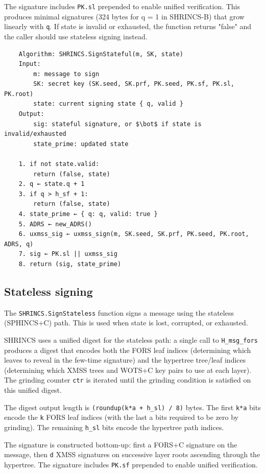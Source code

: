 The signature includes \texttt{PK.sl} prepended to enable unified verification. This produces minimal signatures (324 bytes for q = 1 in SHRINCS-B) that grow linearly with \texttt{q}. If state is invalid or exhausted, the function returns "false" and the caller should use stateless signing instead.
\begin{verbatim}
    Algorithm: SHRINCS.SignStateful(m, SK, state)
    Input:
        m: message to sign
        SK: secret key (SK.seed, SK.prf, PK.seed, PK.sf, PK.sl, PK.root)
        state: current signing state { q, valid }
    Output:
        sig: stateful signature, or $\bot$ if state is invalid/exhausted
        state_prime: updated state

    1. if not state.valid:
        return (false, state)
    2. q ← state.q + 1
    3. if q > h_sf + 1:
        return (false, state)
    4. state_prime ← { q: q, valid: true }
    5. ADRS ← new_ADRS()
    6. uxmss_sig ← uxmss_sign(m, SK.seed, SK.prf, PK.seed, PK.root, ADRS, q)
    7. sig ← PK.sl || uxmss_sig
    8. return (sig, state_prime)
\end{verbatim}

\subsection{Stateless signing}
The \texttt{SHRINCS.SignStateless} function signs a message using the stateless (SPHINCS+C) path. This is used when state is lost, corrupted, or exhausted.

SHRINCS uses a unified digest for the stateless path: a single call to \texttt{H\_msg\_fors} produces a digest that encodes both the FORS leaf indices (determining which leaves to reveal in the few-time signature) and the hypertree tree/leaf indices (determining which XMSS trees and WOTS+C key pairs to use at each layer). The grinding counter \texttt{ctr} is iterated until the grinding condition is satisfied on this unified digest.

The digest output length is \texttt{(roundup(k*a + h\_sl) / 8)} bytes. The first \texttt{k*a} bits encode the \texttt{k} FORS leaf indices (with the last a bits required to be zero by grinding). The remaining \texttt{h\_sl} bits encode the hypertree path indices.

The signature is constructed bottom-up: first a FORS+C signature on the message, then \texttt{d} XMSS signatures on successive layer roots ascending through the hypertree. The signature includes \texttt{PK.sf} prepended to enable unified verification.

